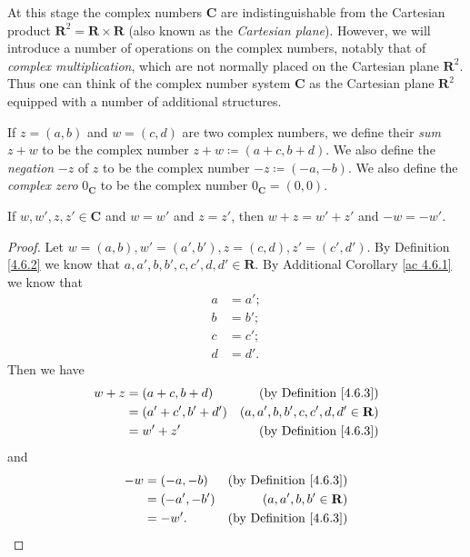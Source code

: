 \begin{note}
    At this stage the complex numbers \(\mathbf{C}\) are indistinguishable from the Cartesian product \(\mathbf{R}^2 = \mathbf{R} \times \mathbf{R}\)
    (also known as the \emph{Cartesian plane}).
    However, we will introduce a number of operations on the complex numbers, notably that of \emph{complex multiplication}, which are not normally placed on the Cartesian plane \(\mathbf{R}^2\).
    Thus one can think of the complex number system \(\mathbf{C}\) as the Cartesian plane \(\mathbf{R}^2\) equipped with a number of additional structures.
\end{note}

\begin{definition}\label{4.6.3}
    If \(z = (a, b)\) and \(w = (c, d)\) are two complex numbers, we define their \emph{sum} \(z + w\) to be the complex number \(z + w \coloneqq (a + c, b + d)\).
    We also define the \emph{negation} \(-z\) of \(z\) to be the complex number \(-z \coloneqq (-a, -b)\).
    We also define the \emph{complex zero} \(0_{\mathbf{C}}\) to be the complex number \(0_{\mathbf{C}} = (0, 0)\).
\end{definition}

\begin{additional corollary}\label{ac 4.6.2}
If \(w, w', z, z' \in \mathbf{C}\) and \(w = w'\) and \(z = z'\), then \(w + z = w' + z'\) and \(-w = -w'\).
\end{additional corollary}

\begin{proof}
    Let \(w = (a, b), w' = (a', b'), z = (c, d), z' = (c', d')\).
    By Definition \ref{4.6.2} we know that \(a, a', b, b', c, c', d, d' \in \mathbf{R}\).
    By Additional Corollary \ref{ac 4.6.1} we know that
    \begin{align*}
        a & = a'; \\
        b & = b'; \\
        c & = c'; \\
        d & = d'.
    \end{align*}
    Then we have
    \begin{align*}
        w + z & = (a + c, b + d)     & \text{(by Definition \ref{4.6.3})}          \\
              & = (a' + c', b' + d') & (a, a', b, b', c, c', d, d' \in \mathbf{R}) \\
              & = w' + z'            & \text{(by Definition \ref{4.6.3})}
    \end{align*}
    and
    \begin{align*}
        -w & = (-a, -b)   & \text{(by Definition \ref{4.6.3})} \\
           & = (-a', -b') & (a, a', b, b' \in \mathbf{R})      \\
           & = -w'.       & \text{(by Definition \ref{4.6.3})}
    \end{align*}
\end{proof}

